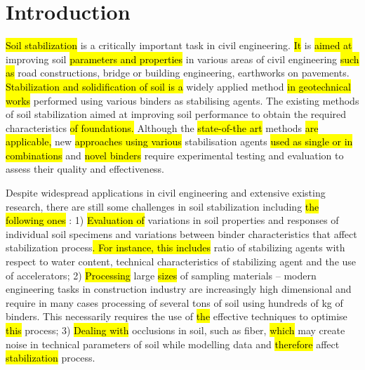 \documentclass[eprint,
]{actapoly}
\begin{document}
\maketitle

\section{Introduction}

\hl{Soil stabilization} is a critically important task in civil engineering. \hl{It }is \hl{aimed at} improving soil \hl{parameters and properties }in various areas of civil engineering \hl{such as} road constructions, bridge or building engineering, earthworks on pavements. \hl{Stabilization and solidification of soil is a }widely applied method\hl{ in geotechnical works }performed using various binders as stabilising agents. The existing methods of soil stabilization aimed at improving soil performance to obtain the required characteristics \hl{of foundations. }Although the \hl{state-of-the art }methods \hl{are applicable, }new \hl{approaches using various }stabilisation agents \hl{used as single  or in combinations }and \hl{novel binders }require experimental testing and evaluation to assess their quality and effectiveness. 

Despite\hl{ }widespread applications in civil engineering and extensive existing research, there are still some challenges in soil stabilization including\hl{ the following ones }: 1) \hl{Evaluation of }variations in soil properties and responses of individual soil specimens and\hl{ }variations between binder characteristics that affect stabilization process\hl{. For instance, this includes }ratio of stabilizing agents with respect to water content, technical characteristics of stabilizing agent and the use of accelerators; 2) \hl{Processing }large \hl{sizes }of sampling materials – modern engineering tasks in construction industry are increasingly high dimensional and require in many cases processing of several tons of soil using hundreds of kg of binders. This necessarily requires the use of \hl{the }effective techniques to optimise \hl{this }process; 3) \hl{Dealing with }occlusions in soil, such as fiber, \hl{which }may create\hl{ }noise in technical parameters of soil while modelling data and \hl{therefore }affect \hl{stabilization }process. 
\end{document}
